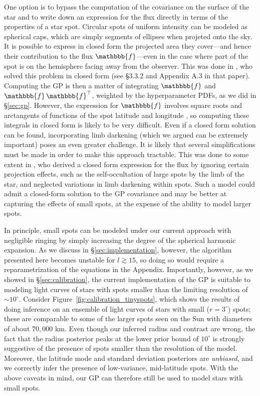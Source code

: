 \documentclass[modern]{aastex62}
\begin{document}
One option is to bypass the computation of the covariance on the surface of
the star and to write down an expression for the flux directly in terms of
the properties of a star spot. Circular spots of uniform intensity can be
modeled as spherical caps, which are simply segments of ellipses when
projeted onto the sky. It is possible to express in closed form the projected area
they cover---and hence their contribution to the flux $\mathbbb{f}$---even in the case
where part of the spot is on the hemisphere facing away from the observer.
This was done in \citet{Luger2017}, who solved this problem in closed form
(see \S3.3.2 and Appendix A.3 in that paper). Computing the GP is then a matter of
integrating $\mathbbb{f}$ and $\mathbbb{f}\,\mathbbb{f}^\top$, weighted by
the hyperparameter PDFs, as we did in \S\ref{sec:gp}.
However, the expression for
$\mathbbb{f}$ involves square roots and arctangents of functions of the spot
latitude and longitude
\citep[c.f. Equation~40 in][]{Luger2017},
so computing these integrals in closed form is
likely to be very difficult. Even if a closed form solution can be found,
incorporating limb darkening (which we argued can be extremely important)
poses an even greater challenge. It is likely that several simplifications
must be made in order to make this approach tractable. This was done to some
extent in \citet{Morris2020}, who derived a closed form expression for the flux by
ignoring certain projection effects, such
as the self-occultation of large spots by the limb of the star, and neglected
variations in limb darkening within spots. Such a model could admit a closed-form
solution to the GP covariance and may be better at capturing the effects
of small spots, at the expense of the ability to model larger spots.

In principle, small spots can be modeled under our current
approach with negligible ringing by simply
increasing the degree of the spherical harmonic expansion. As we discuss in
\S\ref{sec:implementation}, however, the algorithm presented here becomes
unstable for $l \gtrsim 15$, so doing so would require a reparametrization
of the equations in the Appendix. Importantly, however, as we showed in
\S\ref{sec:calibration}, the current implementation of the GP is suitable
to modeling light curves of stars with spots smaller than the limiting
resolution of $\sim 10^\circ$. Consider Figure~\ref{fig:calibration_tinyspots},
which shows the results of doing inference on an ensemble of light curves
of stars with small ($r = 3^\circ$) spots; these are comparable to some of
the larger spots seen on the Sun with diameters of about $70,000$ km.
Even though our inferred radius and contrast are wrong, the fact that the radius
posterior peaks
at the lower prior bound of $10^\circ$ is strongly suggestive of the presence
of spots smaller than the resolution of the model. Moreover, the
latitude mode and standard deviation posteriors are \emph{unbiased}, and we
correctly infer the presence of low-variance, mid-latitude spots.
With the above caveats in mind, our GP can therefore still be used to model
stars with small spots.
\end{document}
